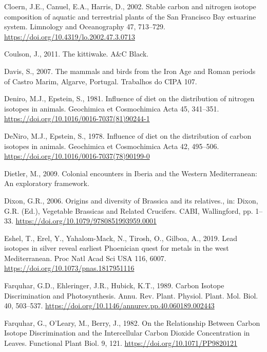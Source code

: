 \documentclass[preprint, 3p, authoryear]{elsarticle} %
\newlength{\cslhangindent}
\newlength{\cslentryspacingunit} %
\newenvironment{CSLReferences}[2] %
 {%
  \setlength{\parindent}{0pt}
  \ifodd #1
  \let\oldpar\par
  \def\par{\hangindent=\cslhangindent\oldpar}
  \fi
  \setlength{\parskip}{#2\cslentryspacingunit}
 }%
 {}
\begin{document}
\begin{CSLReferences}{1}{0}
\leavevmode{}%
Cloern, J.E., Canuel, E.A., Harris, D., 2002. Stable carbon and nitrogen isotope composition of aquatic and terrestrial plants of the {San Francisco Bay} estuarine system. Limnology and Oceanography 47, 713--729. \url{https://doi.org/10.4319/lo.2002.47.3.0713}

\leavevmode{}%
Coulson, J., 2011. The kittiwake. {A\&C Black}.

\leavevmode{}%
Davis, S., 2007. The mammals and birds from the {Iron Age} and {Roman} periods of {Castro Marim}, {Algarve}, {Portugal}. Trabalhos do CIPA 107.

\leavevmode{}%
Deniro, M.J., Epstein, S., 1981. Influence of diet on the distribution of nitrogen isotopes in animals. Geochimica et Cosmochimica Acta 45, 341--351. \url{https://doi.org/10.1016/0016-7037(81)90244-1}

\leavevmode{}%
DeNiro, M.J., Epstein, S., 1978. Influence of diet on the distribution of carbon isotopes in animals. Geochimica et Cosmochimica Acta 42, 495--506. \url{https://doi.org/10.1016/0016-7037(78)90199-0}

\leavevmode{}%
Dietler, M., 2009. Colonial encounters in {Iberia} and the {Western Mediterranean}: {An} exploratory framework.

\leavevmode{}%
Dixon, G.R., 2006. Origins and diversity of {Brassica} and its relatives., in: Dixon, G.R. (Ed.), Vegetable Brassicas and Related Crucifers. {CABI}, {Wallingford}, pp. 1--33. \url{https://doi.org/10.1079/9780851993959.0001}

\leavevmode{}%
Eshel, T., Erel, Y., Yahalom-Mack, N., Tirosh, O., Gilboa, A., 2019. Lead isotopes in silver reveal earliest {Phoenician} quest for metals in the west {Mediterranean}. Proc Natl Acad Sci USA 116, 6007. \url{https://doi.org/10.1073/pnas.1817951116}

\leavevmode{}%
Farquhar, G.D., Ehleringer, J.R., Hubick, K.T., 1989. Carbon {Isotope Discrimination} and {Photosynthesis}. Annu. Rev. Plant. Physiol. Plant. Mol. Biol. 40, 503--537. \url{https://doi.org/10.1146/annurev.pp.40.060189.002443}

\leavevmode{}%
Farquhar, G., O'Leary, M., Berry, J., 1982. On the {Relationship Between Carbon Isotope Discrimination} and the {Intercellular Carbon Dioxide Concentration} in {Leaves}. Functional Plant Biol. 9, 121. \url{https://doi.org/10.1071/PP9820121}


\end{CSLReferences}
\end{document}
